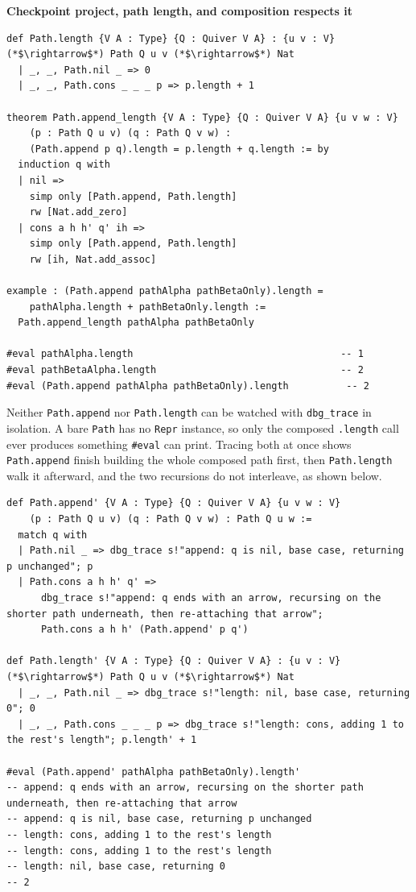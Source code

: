 \textbf{Checkpoint project, path length, and composition respects it}

\begin{lstlisting}
def Path.length {V A : Type} {Q : Quiver V A} : {u v : V} (*$\rightarrow$*) Path Q u v (*$\rightarrow$*) Nat
  | _, _, Path.nil _ => 0
  | _, _, Path.cons _ _ _ p => p.length + 1

theorem Path.append_length {V A : Type} {Q : Quiver V A} {u v w : V}
    (p : Path Q u v) (q : Path Q v w) :
    (Path.append p q).length = p.length + q.length := by
  induction q with
  | nil =>
    simp only [Path.append, Path.length]
    rw [Nat.add_zero]
  | cons a h h' q' ih =>
    simp only [Path.append, Path.length]
    rw [ih, Nat.add_assoc]

example : (Path.append pathAlpha pathBetaOnly).length =
    pathAlpha.length + pathBetaOnly.length :=
  Path.append_length pathAlpha pathBetaOnly

#eval pathAlpha.length                                    -- 1
#eval pathBetaAlpha.length                                -- 2
#eval (Path.append pathAlpha pathBetaOnly).length          -- 2
\end{lstlisting}

Neither \texttt{Path.append} nor \texttt{Path.length} can be watched with \texttt{dbg\_\allowbreak{}trace} in isolation. A bare \texttt{Path} has no \texttt{Repr} instance, so only the composed \texttt{.length} call ever produces something \texttt{\#eval} can print. Tracing both at once shows \texttt{Path.append} finish building the whole composed path first, then \texttt{Path.length} walk it afterward, and the two recursions do not interleave, as shown below.

\begin{lstlisting}
def Path.append' {V A : Type} {Q : Quiver V A} {u v w : V}
    (p : Path Q u v) (q : Path Q v w) : Path Q u w :=
  match q with
  | Path.nil _ => dbg_trace s!"append: q is nil, base case, returning p unchanged"; p
  | Path.cons a h h' q' =>
      dbg_trace s!"append: q ends with an arrow, recursing on the shorter path underneath, then re-attaching that arrow";
      Path.cons a h h' (Path.append' p q')

def Path.length' {V A : Type} {Q : Quiver V A} : {u v : V} (*$\rightarrow$*) Path Q u v (*$\rightarrow$*) Nat
  | _, _, Path.nil _ => dbg_trace s!"length: nil, base case, returning 0"; 0
  | _, _, Path.cons _ _ _ p => dbg_trace s!"length: cons, adding 1 to the rest's length"; p.length' + 1

#eval (Path.append' pathAlpha pathBetaOnly).length'
-- append: q ends with an arrow, recursing on the shorter path underneath, then re-attaching that arrow
-- append: q is nil, base case, returning p unchanged
-- length: cons, adding 1 to the rest's length
-- length: cons, adding 1 to the rest's length
-- length: nil, base case, returning 0
-- 2
\end{lstlisting}

